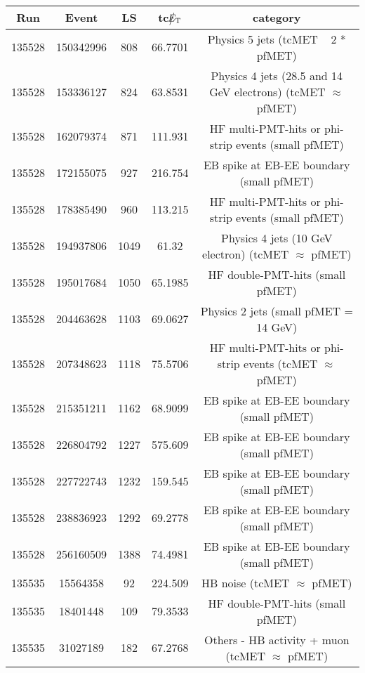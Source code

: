 \begin{table}[htbp]
  \begin{center}
    \begin{tabular}{|c|c|c|c|c|}
      \hline
      Run & Event & LS & tc$\big\slash\hspace{-1.6ex}{E_\text{T}}$ & category \\     
      \hline
      135528  & 150342996    & 808  &    66.7701 & Physics 5 jets (tcMET ~ 2 * pfMET) \\
      135528  & 153336127    & 824  &    63.8531 & Physics 4 jets (28.5 and 14 GeV electrons) (tcMET $\approx$ pfMET) \\
      135528  & 162079374    & 871  &    111.931 & HF multi-PMT-hits or phi-strip events (small pfMET) \\
      135528  & 172155075    & 927  &    216.754 & EB spike at EB-EE boundary (small pfMET) \\
      135528  & 178385490    & 960  &    113.215 & HF multi-PMT-hits or phi-strip events (small pfMET) \\
      135528  & 194937806    & 1049 &    61.32   & Physics 4 jets (10 GeV electron) (tcMET $\approx$ pfMET) \\
      135528  & 195017684    & 1050 &    65.1985 & HF double-PMT-hits (small pfMET) \\
      135528  & 204463628    & 1103 &    69.0627 & Physics 2 jets (small pfMET =  14 GeV) \\
      135528  & 207348623    & 1118 &    75.5706 & HF multi-PMT-hits or phi-strip events (tcMET $\approx$ pfMET) \\ 
      135528  & 215351211    & 1162 &    68.9099 & EB spike at EB-EE boundary (small pfMET) \\
      135528  & 226804792    & 1227 &    575.609 & EB spike at EB-EE boundary (small pfMET) \\
      135528  & 227722743    & 1232 &    159.545 & EB spike at EB-EE boundary (small pfMET) \\
      135528  & 238836923    & 1292 &    69.2778 & EB spike at EB-EE boundary (small pfMET) \\
      135528  & 256160509    & 1388 &    74.4981 & EB spike at EB-EE boundary (small pfMET) \\
      135535  & 15564358     & 92   &    224.509 & HB noise (tcMET $\approx$ pfMET) \\
      135535  & 18401448     & 109  &    79.3533 & HF double-PMT-hits (small pfMET) \\
      135535  & 31027189     & 182  &    67.2768 & Others - HB activity + muon (tcMET $\approx$ pfMET) \\

\end{tabular}
\end{center}
\end{table}
